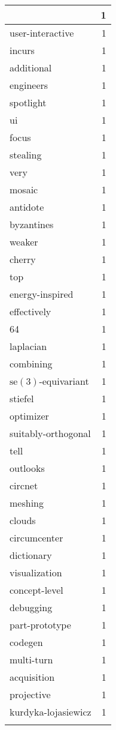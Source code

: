 \begin{table}[h]
\begin{tabular}{|l|r|}
{\hline
logit & 1 \\
\hline
user-interactive & 1 \\
\hline
incurs & 1 \\
\hline
additional & 1 \\
\hline
engineers & 1 \\
\hline
spotlight & 1 \\
\hline
ui & 1 \\
\hline
focus & 1 \\
\hline
stealing & 1 \\
\hline
very & 1 \\
\hline
mosaic & 1 \\
\hline
antidote & 1 \\
\hline
byzantines & 1 \\
\hline
weaker & 1 \\
\hline
cherry & 1 \\
\hline
top & 1 \\
\hline
energy-inspired & 1 \\
\hline
effectively & 1 \\
\hline
64 & 1 \\
\hline
laplacian & 1 \\
\hline
combining & 1 \\
\hline
$\mathrm{se}(3)$-equivariant & 1 \\
\hline
stiefel & 1 \\
\hline
optimizer & 1 \\
\hline
suitably-orthogonal & 1 \\
\hline
tell & 1 \\
\hline
outlooks & 1 \\
\hline
circnet & 1 \\
\hline
meshing & 1 \\
\hline
clouds & 1 \\
\hline
circumcenter & 1 \\
\hline
dictionary & 1 \\
\hline
visualization & 1 \\
\hline
concept-level & 1 \\
\hline
debugging & 1 \\
\hline
part-prototype & 1 \\
\hline
codegen & 1 \\
\hline
multi-turn & 1 \\
\hline
acquisition & 1 \\
\hline
projective & 1 \\
\hline
kurdyka-lojasiewicz & 1 \\
}
\end{tabular}
\end{table}

